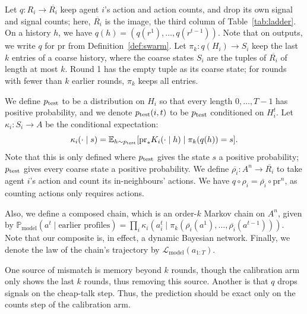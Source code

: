 \begin{definition}\label{def:audit}    
    Let $q \colon R_i \to \overbar{R_i}$ keep agent $i$'s action and action counts, and drop its own signal and signal counts; here, $\overbar{R_i}$ is the image, the third column of Table~\ref{tab:ladder}.
    On a history $h$, we have $q(h) = (q(r^1), \ldots, q(r^{t-1}))$.
    Note that on outputs, we write $q$ for $\mathrm{pr}$ from Definition~\ref{def:swarm}.
    Let $\pi_k \colon q(H_i) \to S_i$ keep the last $k$ entries of a coarse history, where the coarse states $S_i$ are the tuples of $\overbar{R_i}$ of length at most $k$.
    Round 1 has the empty tuple as its coarse state; for rounds with fewer than $k$ earlier rounds, $\pi_k$ keeps all entries.
    
    We define $p_{\mathrm{test}}$ to be a distribution on $H_i$ so that every length $0, \ldots, T-1$ has positive probability, and we denote $p_{\mathrm{test}}(i, t)$ to be $p_{\mathrm{test}}$ conditioned on $H^t_i$.
    Let $\kappa_i \colon S_i \to A$ be the conditional expectation:
    \begin{equation}
        \kappa_i(\cdot \mid s) = \mathbb{E}_{h \sim p_{\mathrm{test}}}[\mathrm{pr}_* K_i(\cdot \mid h) \mid \pi_k(q(h)) = s].
    \end{equation}
    Note that this is only defined where $p_{\mathrm{test}}$ gives the state $s$ a positive probability; $p_{\mathrm{test}}$ gives every coarse state a positive probability.
    We define $\overbar{\rho_i} \colon A^n \to \overbar{R_i}$ to take agent $i$'s action and count its in-neighbours' actions.
    We have $q \circ \rho_i = \overbar{\rho_i} \circ \mathrm{pr}^n$, as counting actions only requires actions.

    Also, we define a composed chain, which is an order-$k$ Markov chain on $A^n$, given by $\mathbb{P}_{\text{model}}(a^t \mid \text{earlier profiles}) = \prod_i \kappa_i(a^t_i \mid \pi_k(\overbar{\rho_i}(a^1), \ldots, \overbar{\rho_i}(a^{t-1})))$.
    Note that our composite is, in effect, a dynamic Bayesian network.
    Finally, we denote the law of the chain's trajectory by $\mathcal{L}_{\text{model}}(a_{1:T})$.
\end{definition}

One source of mismatch is memory beyond $k$ rounds, though the calibration arm only shows the last $k$ rounds, thus removing this source.
Another is that $q$ drops signals on the cheap-talk step.
Thus, the prediction should be exact only on the counts step of the calibration arm.